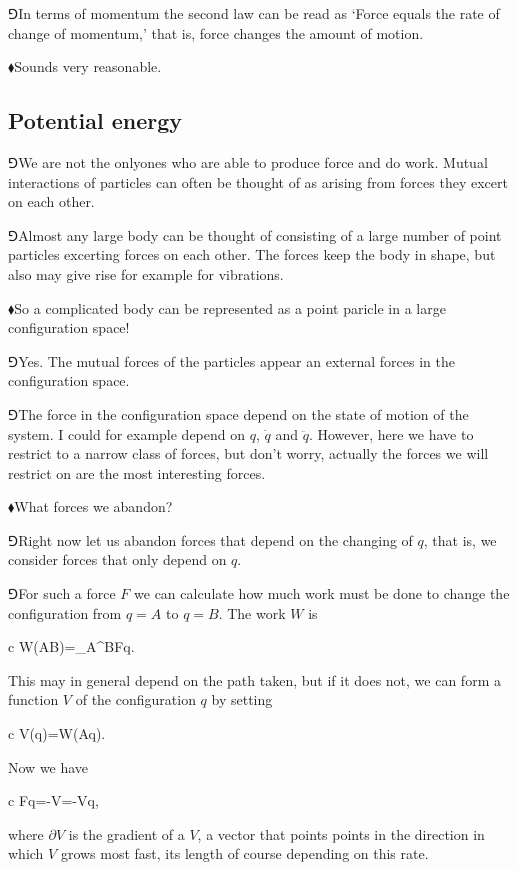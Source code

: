 \documentclass[10pt,oneside%
]{memoir}
\newenvironment{eqna}{\begin{IEEEeqnarray*}{c}}{\end{IEEEeqnarray*}\ignorespacesafterend}
\newcommand{\dd}{\mathrm{d}}
\newcommand{\hea}{\(\blacklozenge\)\;}
\newcommand{\heb}{\(\Game\)\;}
\begin{document}
\heb In terms of momentum the second law can be read as `Force equals the rate of change of momentum,' that is, force changes the amount of motion.

\hea Sounds very reasonable.
\subsection{Potential energy}
\heb We are not the onlyones who are able to produce force and do work. Mutual interactions of particles can often be thought of as arising from forces they excert on each other.

\heb Almost any large body can be thought of consisting of a large number of point particles excerting forces on each other. The forces keep the body in shape, but also may give rise for example for vibrations.

\hea So a complicated body can be represented as a point paricle in a large configuration space!

\heb Yes. The mutual forces of the particles appear an external forces in the configuration space.

\heb The force in the configuration space depend on the state of motion of the system. I could for example depend on \(q\), \(\dot{q}\) and \(\ddot{q}\). However, here we have to restrict to a narrow class of forces, but don't worry, actually the forces we will restrict on are the most interesting forces.

\hea What forces we abandon?

\heb Right now let us abandon forces that depend on the changing of \(q\), that is, we consider forces that only depend on \(q\).

\heb For such a force \(F\) we can calculate how much work must be done to change the configuration from \(q=A\) to \(q=B\). The work \(W\) is
\begin{eqna}
    W(A\rightarrow B)=\int_{A}^{B}F\cdot\dd q.
\end{eqna}
This may in general depend on the path taken, but if it does not, we can form a function \(V\) of the configuration \(q\) by setting
\begin{eqna}
    V(q)=W(A\rightarrow q).
\end{eqna}
Now we have%
\begin{eqna}
    F\cdot\dd q=-\dd V=-\partial V\cdot\dd q,
\end{eqna}
where \(\partial V\) is the gradient of a \(V\), a vector that points points in the direction in which \(V\) grows most fast, its length of course depending on this rate.
\end{document}
